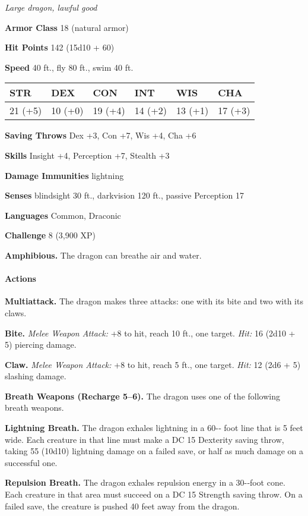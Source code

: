 \documentclass[
]{article}
\begin{document}
\emph{Large dragon, lawful good}

\textbf{Armor Class} 18 (natural armor)

\textbf{Hit Points} 142 (15d10 + 60)

\textbf{Speed} 40 ft., fly 80 ft., swim 40 ft.

\begin{longtable}[]{@{}llllll@{}}
\toprule
STR & DEX & CON & INT & WIS & CHA\tabularnewline
\midrule
\endhead
21 (+5) & 10 (+0) & 19 (+4) & 14 (+2) & 13 (+1) & 17 (+3)\tabularnewline
\bottomrule
\end{longtable}

\textbf{Saving Throws} Dex +3, Con +7, Wis +4, Cha +6

\textbf{Skills} Insight +4, Perception +7, Stealth +3

\textbf{Damage Immunities} lightning

\textbf{Senses} blindsight 30 ft., darkvision 120 ft., passive
Perception 17

\textbf{Languages} Common, Draconic

\textbf{Challenge} 8 (3,900 XP)

\textbf{Amphibious.} The dragon can breathe air and water.

\hypertarget{actions-49}{%
\paragraph{Actions}\label{actions-49}}

\textbf{Multiattack.} The dragon makes three attacks: one with its bite
and two with its claws.

\textbf{Bite.} \emph{Melee Weapon Attack:} +8 to hit, reach 10 ft., one
target. \emph{Hit:} 16 (2d10 + 5) piercing damage.

\textbf{Claw.} \emph{Melee Weapon Attack:} +8 to hit, reach 5 ft., one
target. \emph{Hit:} 12 (2d6 + 5) slashing damage.

\textbf{Breath Weapons (Recharge 5--6).} The dragon uses one of the
following breath weapons.

\textbf{Lightning Breath.} The dragon exhales lightning in a 60-­‐ foot
line that is 5 feet wide. Each creature in that line must make a DC 15
Dexterity saving throw, taking 55 (10d10) lightning damage on a failed
save, or half as much damage on a successful one.

\textbf{Repulsion Breath.} The dragon exhales repulsion energy in a
30-­‐foot cone. Each creature in that area must succeed on a DC 15
Strength saving throw. On a failed save, the creature is pushed 40 feet
away from the dragon.
\end{document}
